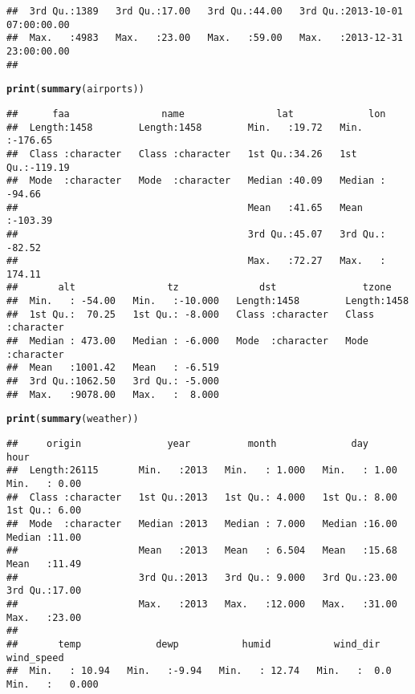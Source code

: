 \documentclass{article}\usepackage[]{graphicx}\usepackage[]{xcolor}
\makeatletter
\newcommand{\hlstd}[1]{\textcolor[rgb]{0.345,0.345,0.345}{#1}}%
\newcommand{\hlkwd}[1]{\textcolor[rgb]{0.737,0.353,0.396}{\textbf{#1}}}%
\newenvironment{kframe}{%
 \def\at@end@of@kframe{}%
 \ifinner\ifhmode%
  \def\at@end@of@kframe{\end{minipage}}%
  \begin{minipage}{\columnwidth}%
 \fi\fi%
 \def\FrameCommand##1{\hskip\@totalleftmargin \hskip-\fboxsep
 \colorbox{shadecolor}{##1}\hskip-\fboxsep
     \hskip-\linewidth \hskip-\@totalleftmargin \hskip\columnwidth}%
 \MakeFramed {\advance\hsize-\width
   \@totalleftmargin\z@ \linewidth\hsize
   \@setminipage}}%
 {\par\unskip\endMakeFramed%
 \at@end@of@kframe}
\newenvironment{knitrout}{}{} %
\makeatother
\begin{document}
\begin{knitrout}
\begin{kframe}
\begin{verbatim}
##  3rd Qu.:1389   3rd Qu.:17.00   3rd Qu.:44.00   3rd Qu.:2013-10-01 07:00:00.00  
##  Max.   :4983   Max.   :23.00   Max.   :59.00   Max.   :2013-12-31 23:00:00.00  
## 
\end{verbatim}
\begin{alltt}
\hlkwd{print}\hlstd{(}\hlkwd{summary}\hlstd{(airports))}
\end{alltt}
\begin{verbatim}
##      faa                name                lat             lon         
##  Length:1458        Length:1458        Min.   :19.72   Min.   :-176.65  
##  Class :character   Class :character   1st Qu.:34.26   1st Qu.:-119.19  
##  Mode  :character   Mode  :character   Median :40.09   Median : -94.66  
##                                        Mean   :41.65   Mean   :-103.39  
##                                        3rd Qu.:45.07   3rd Qu.: -82.52  
##                                        Max.   :72.27   Max.   : 174.11  
##       alt                tz              dst               tzone          
##  Min.   : -54.00   Min.   :-10.000   Length:1458        Length:1458       
##  1st Qu.:  70.25   1st Qu.: -8.000   Class :character   Class :character  
##  Median : 473.00   Median : -6.000   Mode  :character   Mode  :character  
##  Mean   :1001.42   Mean   : -6.519                                        
##  3rd Qu.:1062.50   3rd Qu.: -5.000                                        
##  Max.   :9078.00   Max.   :  8.000
\end{verbatim}
\begin{alltt}
\hlkwd{print}\hlstd{(}\hlkwd{summary}\hlstd{(weather))}
\end{alltt}
\begin{verbatim}
##     origin               year          month             day             hour      
##  Length:26115       Min.   :2013   Min.   : 1.000   Min.   : 1.00   Min.   : 0.00  
##  Class :character   1st Qu.:2013   1st Qu.: 4.000   1st Qu.: 8.00   1st Qu.: 6.00  
##  Mode  :character   Median :2013   Median : 7.000   Median :16.00   Median :11.00  
##                     Mean   :2013   Mean   : 6.504   Mean   :15.68   Mean   :11.49  
##                     3rd Qu.:2013   3rd Qu.: 9.000   3rd Qu.:23.00   3rd Qu.:17.00  
##                     Max.   :2013   Max.   :12.000   Max.   :31.00   Max.   :23.00  
##                                                                                    
##       temp             dewp           humid           wind_dir       wind_speed      
##  Min.   : 10.94   Min.   :-9.94   Min.   : 12.74   Min.   :  0.0   Min.   :   0.000  

\end{verbatim}
\end{kframe}
\end{knitrout}
\end{document}
